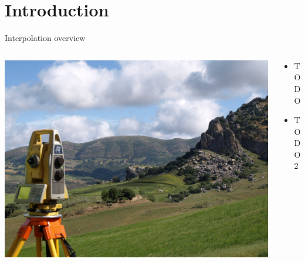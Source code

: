 
\section{Introduction}
\begin{frame}{Interpolation overview}
	\begin{columns}[T] %
		\begin{column}{.48\textwidth}
			\includegraphics[width=\linewidth]{images/background}
		\end{column}%
		\hfill%
		\begin{column}{.56\textwidth}
			\begin{itemize}
				\item TODO
				\item TODO 2
			\end{itemize}
		\end{column}%
	\end{columns}
\end{frame}
